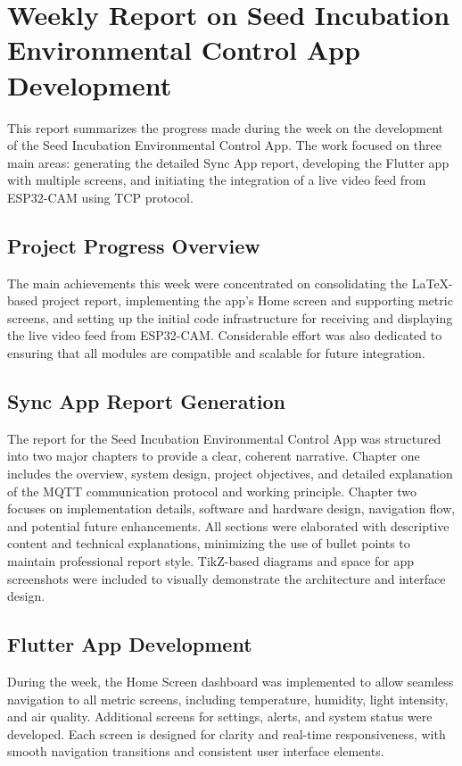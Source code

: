 \documentclass[12pt,a4paper]{report}
\begin{document}
\chapter{Weekly Report on Seed Incubation Environmental Control App Development}

This report summarizes the progress made during the week on the development of the Seed Incubation Environmental Control App. The work focused on three main areas: generating the detailed Sync App report, developing the Flutter app with multiple screens, and initiating the integration of a live video feed from ESP32-CAM using TCP protocol.

\section{Project Progress Overview}

The main achievements this week were concentrated on consolidating the LaTeX-based project report, implementing the app’s Home screen and supporting metric screens, and setting up the initial code infrastructure for receiving and displaying the live video feed from ESP32-CAM. Considerable effort was also dedicated to ensuring that all modules are compatible and scalable for future integration.

\section{Sync App Report Generation}

The report for the Seed Incubation Environmental Control App was structured into two major chapters to provide a clear, coherent narrative. Chapter one includes the overview, system design, project objectives, and detailed explanation of the MQTT communication protocol and working principle. Chapter two focuses on implementation details, software and hardware design, navigation flow, and potential future enhancements. All sections were elaborated with descriptive content and technical explanations, minimizing the use of bullet points to maintain professional report style. TikZ-based diagrams and space for app screenshots were included to visually demonstrate the architecture and interface design.

\section{Flutter App Development}

During the week, the Home Screen dashboard was implemented to allow seamless navigation to all metric screens, including temperature, humidity, light intensity, and air quality. Additional screens for settings, alerts, and system status were developed. Each screen is designed for clarity and real-time responsiveness, with smooth navigation transitions and consistent user interface elements.
\end{document}
